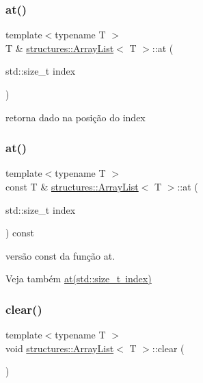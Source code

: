 \subsubsection{\texorpdfstring{at()}{at()}\hspace{0.1cm}{\footnotesize\ttfamily [1/2]}}
{\footnotesize\ttfamily template$<$typename T $>$ \\
T \& \mbox{\hyperlink{classstructures_1_1ArrayList}{structures\+::\+Array\+List}}$<$ T $>$\+::at (\begin{DoxyParamCaption}\item[{std\+::size\+\_\+t}]{index }\end{DoxyParamCaption})}



retorna dado na posição do index 

\mbox{\label{classstructures_1_1ArrayList_a0906cf7f36a593688704135a8201543f}} 
\subsubsection{\texorpdfstring{at()}{at()}\hspace{0.1cm}{\footnotesize\ttfamily [2/2]}}
{\footnotesize\ttfamily template$<$typename T $>$ \\
const T \& \mbox{\hyperlink{classstructures_1_1ArrayList}{structures\+::\+Array\+List}}$<$ T $>$\+::at (\begin{DoxyParamCaption}\item[{std\+::size\+\_\+t}]{index }\end{DoxyParamCaption}) const}

versão const da função at. \begin{DoxySeeAlso}{Veja também}
\mbox{\hyperlink{classstructures_1_1ArrayList_ac21118842acb1131b3b64569c1e5c732}{at(std\+::size\+\_\+t index)}} 
\end{DoxySeeAlso}
\mbox{\label{classstructures_1_1ArrayList_afcef88bcb3924751be3c188bad43531b}} 
\subsubsection{\texorpdfstring{clear()}{clear()}}
{\footnotesize\ttfamily template$<$typename T $>$ \\
void \mbox{\hyperlink{classstructures_1_1ArrayList}{structures\+::\+Array\+List}}$<$ T $>$\+::clear (\begin{DoxyParamCaption}{ }\end{DoxyParamCaption})}



